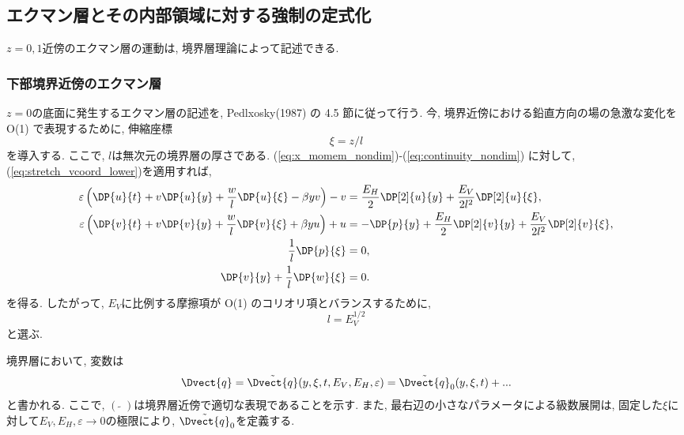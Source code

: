 \subsection{エクマン層とその内部領域に対する強制の定式化}
$z=0,1$近傍のエクマン層の運動は, 境界層理論によって記述できる. 

\subsubsection*{下部境界近傍のエクマン層}
$z=0$の底面に発生するエクマン層の記述を, Pedlxosky(1987) の 4.5 節に従って行う. 
今, 境界近傍における鉛直方向の場の急激な変化を O(1) で表現するために, 
伸縮座標
\begin{equation}
  \xi = z/l 
\label{eq:stretch_vcoord_lower}
\end{equation}
を導入する. 
ここで, $l$は無次元の境界層の厚さである. 
(\ref{eq:x_momem_nondim})-(\ref{eq:continuity_nondim}) に対して, 
(\ref{eq:stretch_vcoord_lower})を適用すれば, 
\begin{subequations}
\begin{align}
  \varepsilon \left( \DP{u}{t} + v\DP{u}{y} + \dfrac{w}{l}\DP{u}{\xi} - \beta y v \right) - v 
       &= \dfrac{E_H}{2} \DP[2]{u}{y} + \dfrac{E_V}{2l^2} \DP[2]{u}{\xi}, \label{eq:x_momem_nondim_lowEkman} \\
  \varepsilon \left( \DP{v}{t} + v\DP{v}{y} + \dfrac{w}{l}\DP{v}{\xi} + \beta y u \right) + u 
       &= - \DP{p}{y} + \dfrac{E_H}{2} \DP[2]{v}{y} + \dfrac{E_V}{2l^2} \DP[2]{v}{\xi}, \label{eq:y_momem_nondim_lowEkman} \\
  \dfrac{1}{l}\DP{p}{\xi} &= 0, \label{eq:hydrostatic_nondim_lowEkman} \\
  \DP{v}{y} + \dfrac{1}{l} \DP{w}{\xi} &= 0. \label{eq:continuity_nondim_lowEkman}
\end{align}
\end{subequations}
を得る. 
したがって, $E_V$に比例する摩擦項が O(1) のコリオリ項とバランスするために, 
\begin{equation}
  l = E_V^{1/2}
\end{equation}
と選ぶ. 

境界層において, 変数は
\begin{equation}
  \Dvect{q} = \tilde{\Dvect{q}}(y,\xi,t,E_V,E_H,\varepsilon)
  = \tilde{\Dvect{q}}_0 (y,\xi,t) + ...
\label{eq:variable_expand_lowEkman}
\end{equation}
と書かれる. 
ここで, $(\tilde{\;\;})$は境界層近傍で適切な表現であることを示す. 
また, 最右辺の小さなパラメータによる級数展開は, 
固定した$\xi$に対して$E_V, E_H, \varepsilon \to 0$の極限により, 
$\tilde{\Dvect{q}}_0$を定義する. 

